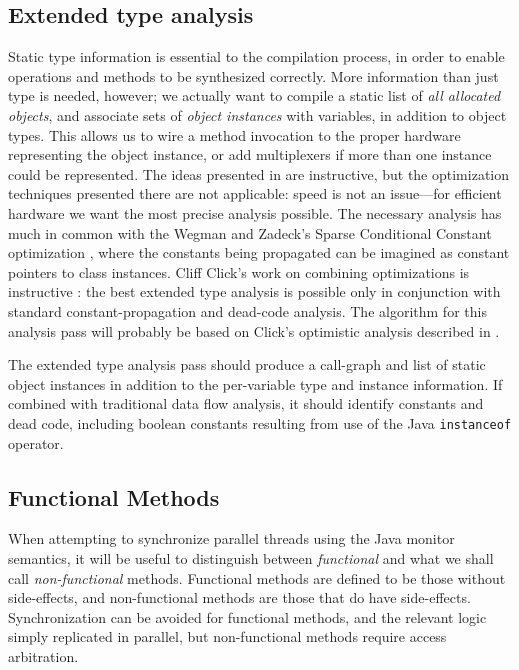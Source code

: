 \documentclass[11pt,notitlepage,twocolumn]{article}
\begin{document}
\subsection{Extended type analysis}
\label{sec:ext_type_analysis}
Static type information is essential to the compilation process, in
order to enable operations and methods to be synthesized correctly.
More information than just type is needed, however; we actually want
to compile a static list of \textit{all allocated objects}, and
associate sets of \textit{object instances} with variables, in
addition to object types.  This allows us to wire a method invocation
to the proper hardware representing the object instance, or add
multiplexers if more than one instance could be represented.  The
ideas presented in \cite{defouw98:classanal} are instructive, but the
optimization techniques presented there are not applicable: speed is
not an issue---for efficient hardware we want the most precise
analysis possible.  The necessary analysis has much in common with
the Wegman and Zadeck's Sparse Conditional Constant optimization
\cite{wegman91:scc}, where the constants being propagated can be
imagined as constant pointers to class instances.  Cliff Click's work
on combining optimizations is instructive \cite{click95:combin}: the
best extended type analysis is possible only in conjunction with
standard constant-propagation and dead-code analysis.  The algorithm
for this analysis pass will probably be based on Click's
optimistic analysis described in \cite{click95:thesis}.

The extended type analysis pass should produce a call-graph and
list of static object instances in addition to the per-variable type
and instance information.  If combined with traditional data flow
analysis, it should identify constants and dead code, including
boolean constants resulting from use of the Java \texttt{instanceof}
operator.

\subsection{Functional Methods}
\label{sec:functional}
When attempting to synchronize parallel threads using the Java monitor
semantics, it will be useful to distinguish between
\textit{functional} and what we shall call \textit{non-functional}
methods.  Functional methods are defined to be those without
side-effects, and non-functional methods are those that do have
side-effects.  Synchronization can be avoided for functional methods,
and the relevant logic simply replicated in parallel, but
non-functional methods require access arbitration.
\end{document}
